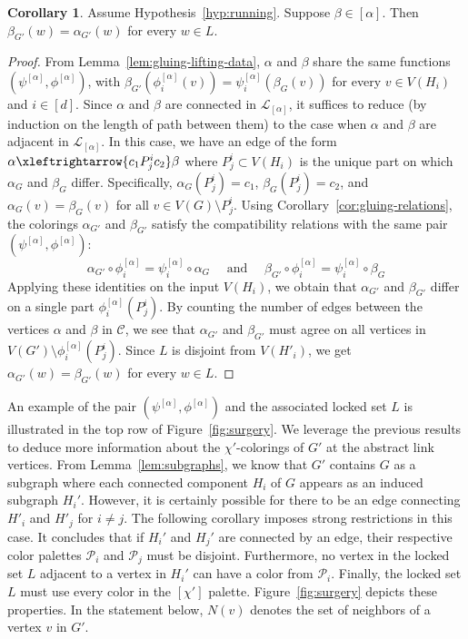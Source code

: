 \documentclass{amsart}
\theoremstyle{hypothesisstyle}
\theoremstyle{definition}
\newtheorem{corollary}[theorem]{Corollary}
\theoremstyle{remark}
\numberwithin{equation}{section}
\begin{document}
\begin{corollary}\label{cor:equivalent-links-agree-on-L} Assume Hypothesis~\ref{hyp:running}.
Suppose $\beta\in [\alpha]$. Then $\beta_{G'}(w)=\alpha_{G'}(w)$ for every $w\in L$.
\end{corollary}
\begin{proof}
From Lemma~\ref{lem:gluing-lifting-data},  $\alpha$ and $\beta$ share the same functions $(\psi^{[\alpha]},\phi^{[\alpha]})$, with $\beta_{G'}(\phi^{[\alpha]}_{i}(v))=\psi_i^{[\alpha]}(\beta_{G}(v))$ for every $v\in V(H_i)$ and $i\in [d]$. Since $\alpha$ and $\beta$ are connected in $\mathcal{L}_{[\alpha]}$, it suffices to reduce (by induction on the length of path between them) to the case when $\alpha$ and $\beta$ are adjacent in $\mathcal{L}_{[\alpha]}$. In this case, we have an edge of the form $\alpha\xleftrightarrow{c_1 P^i_{j}c_2}  \beta$ where $P^{i}_{j}\subset V(H_i)$ is the unique part on which $\alpha_{G}$ and $\beta_{G}$ differ. Specifically, $\alpha_{G}(P^{i}_{j}) = c_1$, $\beta_{G}(P^{i}_{j}) = c_2$, and $\alpha_{G}(v)=\beta_{G}(v)$ for all $v\in V(G)\setminus P^i_{j}$. Using Corollary~\ref{cor:gluing-relations}, the colorings $\alpha_{G'}$ and $\beta_{G'}$ satisfy the compatibility relations with the same pair $(\psi^{[\alpha]}, \phi^{[\alpha]})$:
$$
\alpha_{G'} \circ \phi_i^{[\alpha]} = \psi_{i}^{[\alpha]} \circ \alpha_{G} \quad \text{ and } \quad \beta_{G'} \circ \phi_i^{[\alpha]} = \psi_{i}^{[\alpha]} \circ \beta_{G}
$$
Applying these identities on the input $V(H_i)$, we obtain that $\alpha_{G'}$ and $\beta_{G'}$ differ on a single part $\phi_i^{[\alpha]}(P^{i}_{j})$. By counting the number of edges between the vertices $\alpha$ and $\beta$ in $\mathcal{C}$, we see that $\alpha_{G'}$ and $\beta_{G'}$ must agree on all vertices in $V(G')\setminus \phi_{i}^{[\alpha]}(P^{i}_{j})$. Since $L$ is disjoint from $V(H'_i)$, we get $\alpha_{G'}(w)=\beta_{G'}(w)$ for every $w\in L$.
\end{proof}

An example of the pair $(\psi^{[\alpha]},\phi^{[\alpha]})$ and the associated locked set $L$ is illustrated in the top row of Figure~\ref{fig:surgery}. We leverage the previous results to deduce more information about the $\chi'$-colorings of $G'$ at the abstract link vertices. From Lemma~\ref{lem:subgraphs}, we know that $G'$ contains $G$ as a subgraph where each connected component $H_i$ of $G$ appears as an induced subgraph $H_i'$. However, it is certainly possible for there to be an edge connecting $H'_{i}$ and $H'_{j}$ for $i\neq j$. The following corollary imposes strong restrictions in this case. It concludes that if $H_i'$ and $H_j'$ are connected by an edge, their respective color palettes $\mathcal{P}_i$ and $\mathcal{P}_{j}$ must be disjoint. Furthermore, no vertex in the locked set $L$ adjacent to a vertex in $H_i'$ can have a color from $\mathcal{P}_i$. Finally, the locked set $L$ must use every color in the $[\chi']$ palette. Figure~\ref{fig:surgery} depicts these properties. In the statement below, $N(v)$ denotes the set of neighbors of a vertex $v$ in $G'$.
\end{document}
